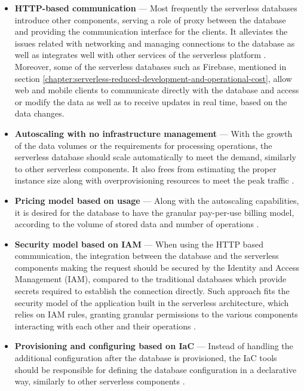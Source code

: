 \begin{itemize}
   \item \textbf{HTTP-based communication} ---
   Most frequently the serverless databases introduce other components, serving a role of proxy between the database and providing the communication interface for the clients.
   It alleviates the issues related with networking and managing connections to the database as well as integrates well with other services of the serverless platform \cite{PickingDatabaseForYourServerlessApplicationIn2021}.
   Moreover, some of the serverless databases such as Firebase, mentioned in section \ref{chapter:serverless-reduced-development-and-operational-cost}, allow web and mobile clients to communicate directly with the database and access or modify the data as well as to receive updates in real time, based on the data changes.
  
   \item \textbf{Autoscaling with no infrastructure management} ---
   With the growth of the data volumes or the requirements for processing operations, the serverless database should scale automatically to meet the demand, similarly to other serverless components.
   It also frees from estimating the proper instance size along with overprovisioning resources to meet the peak traffic \cite{WhatFrontEndDevelopersNeedToKnowAboutServerlessDatabases}.
  
   \item \textbf{Pricing model based on usage} ---
   Along with the autoscaling capabilities, it is desired for the database to have the granular pay-per-use billing model, according to the volume of stored data and number of operations \cite{WhatFrontEndDevelopersNeedToKnowAboutServerlessDatabases}.

   \item \textbf{Security model based on IAM} ---
   When using the HTTP based communication, the integration between the database and the serverless components making the request should be secured by the Identity and Access Management (IAM), compared to the traditional databases which provide secrets required to establish the connection directly.
   Such approach fits the security model of the application built in the serverless architecture, which relies on IAM rules, granting granular permissions to the various components interacting with each other and their operations \cite{PickingDatabaseForYourServerlessApplicationIn2021}.

   \item \textbf{Provisioning and configuring based on IaC} ---
   Instead of handling the additional configuration after the database is provisioned, the IaC tools should be responsible for defining the database configuration in a declarative way, similarly to other serverless components \cite{PickingDatabaseForYourServerlessApplicationIn2021}.


\end{itemize}
